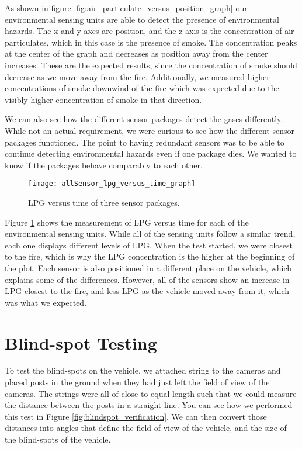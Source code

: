 As shown in figure \ref{fig:air_particulate_versus_position_graph} our environmental sensing units are able to detect the presence of environmental hazards.  The x and y-axes are position, and the z-axis is the concentration of air particulates, which in this case is the presence of smoke.  The concentration peaks at the center of the graph and decreases as position away from the center increases.  These are the expected results, since the concentration of smoke should decrease as we move away from the fire. Additionally, we measured higher concentrations of smoke downwind of the fire which was expected due to the visibly higher concentration of smoke in that direction.

We can also see how the different sensor packages detect the gases differently.  While not an actual requirement, we were curious to see how the different sensor packages functioned.  The point to having redundant sensors was to be able to continue detecting environmental hazards even if one package dies.  We wanted to know if the packages behave comparably to each other.


\begin{figure}[h!]
\centerline{\texttt{[image: allSensor\_lpg\_versus\_time\_graph]}}
\caption[]{LPG versus time of three sensor packages.}
\label{fig:allSensor_lpg_versus_time_graph}
\end{figure}

Figure \ref{fig:allSensor_lpg_versus_time_graph} shows the measurement of LPG versus time for each of the environmental sensing units.  While all of the sensing units follow a similar trend, each one displays different levels of LPG.  When the test started, we were closest to the fire, which is why the LPG concentration is the higher at the beginning of the plot.  Each sensor is also positioned in a different place on the vehicle, which explains some of the differences.  However, all of the sensors show an increase in LPG closest to the fire, and less LPG as the vehicle moved away from it, which was what we expected.

\section{Blind-spot Testing}
To test the blind-spots on the vehicle, we attached string to the cameras and placed posts in the ground when they had just left the field of view of the cameras.  The strings were all of close to equal length such that we could measure the distance between the posts in a straight line. You can see how we performed this test in Figure \ref{fig:blindspot_verification}. We can then convert those distances into angles that define the field of view of the vehicle, and the size of the blind-spots of the vehicle. 


